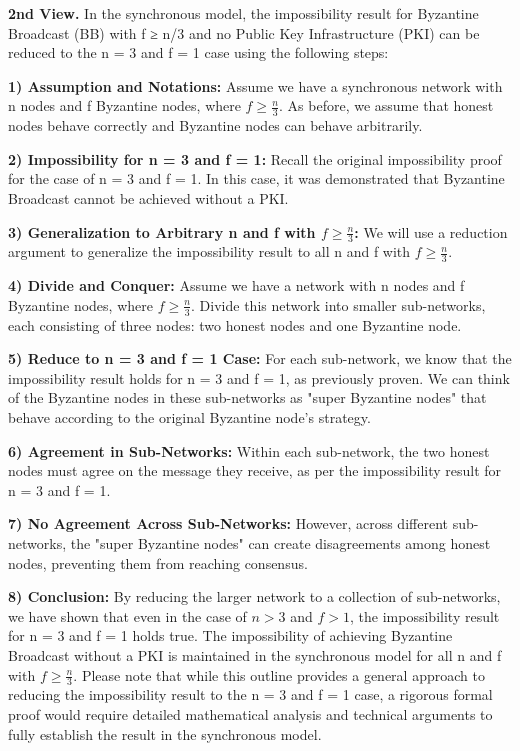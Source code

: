 \documentclass{article}
\begin{document}
\textbf{2nd View.}  In the synchronous model, the impossibility result for Byzantine Broadcast (BB) with f ≥ n/3 and no Public Key Infrastructure (PKI) can be reduced to the n = 3 and f = 1 case using the following steps:

\textbf{1) Assumption and Notations:} Assume we have a synchronous network with n nodes and f Byzantine nodes, where $ f\ge \frac{n}{3}$.
As before, we assume that honest nodes behave correctly and Byzantine nodes can behave arbitrarily.

\textbf{2) Impossibility for n = 3 and f = 1:} Recall the original impossibility proof for the case of n = 3 and f = 1. In this case, it was demonstrated that Byzantine Broadcast cannot be achieved without a PKI.

\textbf{3) Generalization to Arbitrary n and f with $ f\ge \frac{n}{3}$:} We will use a reduction argument to generalize the impossibility result to all n and f with $ f\ge \frac{n}{3}$.

\textbf{4) Divide and Conquer:} Assume we have a network with n nodes and f Byzantine nodes, where $ f\ge \frac{n}{3}$.
Divide this network into smaller sub-networks, each consisting of three nodes: two honest nodes and one Byzantine node.

\textbf{5) Reduce to n = 3 and f = 1 Case:} For each sub-network, we know that the impossibility result holds for n = 3 and f = 1, as previously proven.
We can think of the Byzantine nodes in these sub-networks as "super Byzantine nodes" that behave according to the original Byzantine node's strategy.

\textbf{6) Agreement in Sub-Networks:} Within each sub-network, the two honest nodes must agree on the message they receive, as per the impossibility result for n = 3 and f = 1.

\textbf{7) No Agreement Across Sub-Networks:} However, across different sub-networks, the "super Byzantine nodes" can create disagreements among honest nodes, preventing them from reaching consensus.

\textbf{8) Conclusion:} By reducing the larger network to a collection of sub-networks, we have shown that even in the case of $ n > 3$ and $ f > 1$, the impossibility result for n = 3 and f = 1 holds true.
The impossibility of achieving Byzantine Broadcast without a PKI is maintained in the synchronous model for all n and f with $ f\ge \frac{n}{3}$.
Please note that while this outline provides a general approach to reducing the impossibility result to the n = 3 and f = 1 case, a rigorous formal proof would require detailed mathematical analysis and technical arguments to fully establish the result in the synchronous model.
\end{document}
